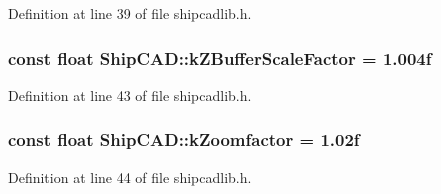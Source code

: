 Definition at line 39 of file shipcadlib.\-h.

\hypertarget{namespaceShipCAD_a519c591e5f5e3f60603b3133a4a2094e}{
\subsubsection[{k\-Z\-Buffer\-Scale\-Factor}]{\setlength{\rightskip}{0pt plus 5cm}const float Ship\-C\-A\-D\-::k\-Z\-Buffer\-Scale\-Factor = 1.\-004f}}\label{namespaceShipCAD_a519c591e5f5e3f60603b3133a4a2094e}


Definition at line 43 of file shipcadlib.\-h.

\hypertarget{namespaceShipCAD_a80babe3fef93f1117e1c410f8d3c22c2}{
\subsubsection[{k\-Zoomfactor}]{\setlength{\rightskip}{0pt plus 5cm}const float Ship\-C\-A\-D\-::k\-Zoomfactor = 1.\-02f}}\label{namespaceShipCAD_a80babe3fef93f1117e1c410f8d3c22c2}


Definition at line 44 of file shipcadlib.\-h.

